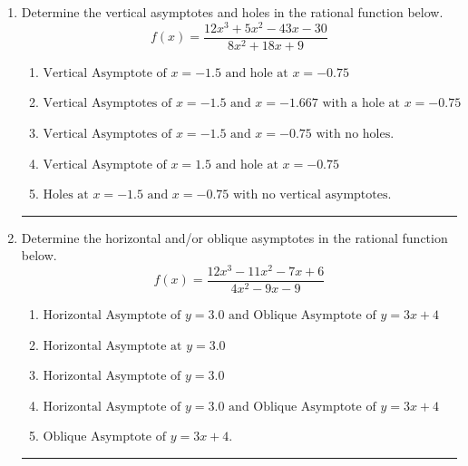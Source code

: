 \documentclass[14pt]{extbook}
\newcommand{\litem}[1]{\item#1\hspace*{-1cm}\rule{\textwidth}{0.4pt}}
\begin{document}
\begin{enumerate}
\litem{
Determine the vertical asymptotes and holes in the rational function below.\[ f(x) = \frac{12x^{3} +5 x^{2} -43 x -30}{8x^{2} +18 x + 9} \]\begin{enumerate}[label=\Alph*.]
\item \( \text{Vertical Asymptote of } x = -1.5 \text{ and hole at } x = -0.75 \)
\item \( \text{Vertical Asymptotes of } x = -1.5 \text{ and } x = -1.667 \text{ with a hole at } x = -0.75 \)
\item \( \text{Vertical Asymptotes of } x = -1.5 \text{ and } x = -0.75 \text{ with no holes.} \)
\item \( \text{Vertical Asymptote of } x = 1.5 \text{ and hole at } x = -0.75 \)
\item \( \text{Holes at } x = -1.5 \text{ and } x = -0.75 \text{ with no vertical asymptotes.} \)

\end{enumerate} }
\litem{
Determine the horizontal and/or oblique asymptotes in the rational function below.\[ f(x) = \frac{12x^{3} -11 x^{2} -7 x + 6}{4x^{2} -9 x -9} \]\begin{enumerate}[label=\Alph*.]
\item \( \text{Horizontal Asymptote of } y = 3.0 \text{ and Oblique Asymptote of } y = 3x + 4 \)
\item \( \text{Horizontal Asymptote at } y = 3.0 \)
\item \( \text{Horizontal Asymptote of } y = 3.0  \)
\item \( \text{Horizontal Asymptote of } y = 3.0 \text{ and Oblique Asymptote of } y = 3x + 4 \)
\item \( \text{Oblique Asymptote of } y = 3x + 4. \)


\end{enumerate}}
\end{enumerate}
\end{document}
